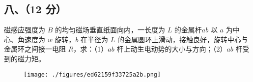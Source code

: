 \subsection{八、（12 分）}
磁感应强度为 $B$ 的均匀磁场垂直纸面向内，一长度为 $L$ 的金属杆$ab$ 以 $a$ 为中心、角速度为 $w$ 旋转，$b$ 在半径为 $L$ 的金属圆环上滑动，接触良好，旋转中心与金属环之间接一电阻 $R$，求：（1）$ab$ 杆上动生电动势的大小与方向；（2）$ab$ 杆受到的磁力矩。
\begin{figure}[ht]
\centering
\texttt{[image: ./figures/ed62159f33725a2b.png]}
\caption{} \label{fig_NJU05_3}
\end{figure}